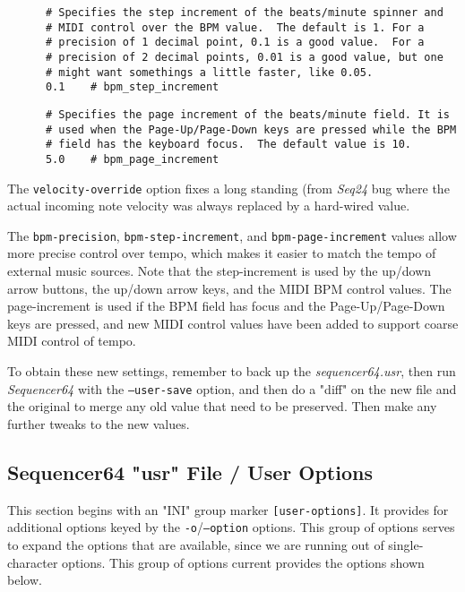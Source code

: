    \begin{verbatim}
      # Specifies the step increment of the beats/minute spinner and
      # MIDI control over the BPM value.  The default is 1. For a
      # precision of 1 decimal point, 0.1 is a good value.  For a
      # precision of 2 decimal points, 0.01 is a good value, but one
      # might want somethings a little faster, like 0.05.
      0.1    # bpm_step_increment
   \end{verbatim}

   \begin{verbatim}
      # Specifies the page increment of the beats/minute field. It is
      # used when the Page-Up/Page-Down keys are pressed while the BPM
      # field has the keyboard focus.  The default value is 10.
      5.0    # bpm_page_increment
   \end{verbatim}

      The \texttt{velocity-override} option fixes a long standing (from
      \textsl{Seq24} bug where the actual incoming note velocity was always
      replaced by a hard-wired value.

      The \texttt{bpm-precision}, \texttt{bpm-step-increment}, and
      \texttt{bpm-page-increment} values allow more precise control over tempo,
      which makes it easier to match the tempo of external music sources.  Note
      that the step-increment is used by the up/down arrow buttons, the up/down
      arrow keys, and the MIDI BPM control values.  The page-increment is used
      if the BPM field has focus and the Page-Up/Page-Down keys are pressed,
      and new MIDI control values have been added to support coarse MIDI
      control of tempo.

   To obtain these new settings, remember to back up the
   \textsl{sequencer64.usr}, then run \textsl{Sequencer64} with the
   \texttt{--user-save} option, and then do a "diff" on the new file and the
   original to merge any old value that need to be preserved.  Then make any
   further tweaks to the new values.

\subsection{Sequencer64 "usr" File / User Options}
\label{subsec:seq64_usr_file_user_options}

   This section begins with an
   "INI" group marker \texttt{[user-options]}.
   It provides for additional options keyed by the
   \texttt{-o}/\texttt{--option} options.
   This group of options serves to expand the options that are available, since
   we are running out of single-character options.
   This group of options current provides the options shown below.

